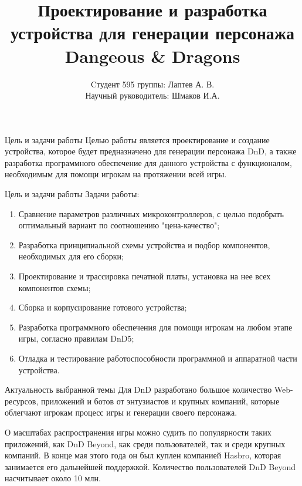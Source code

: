 \documentclass[12pt,a4paper,mathserif]{beamer}
\author[Лаптев А.В.]{{Cтудент 595 группы: Лаптев А. В.}\\
{Научный руководитель: Шмаков И.А.}}
\title[Научно-исследовательская работа]{Проектирование и разработка устройства для генерации персонажа Dangeous \& Dragons}
\begin{document}
\begin{frame}
\maketitle
\end{frame}

\begin{frame}{Цель и задачи работы}
    \setlength{\parindent}{0.5cm}
    Целью работы является проектирование и создание устройства, которое будет предназначено для генерации персонажа DnD, а также разработка программного обеспечение для данного устройства с функционалом, необходимым для помощи игрокам на протяжении всей игры.
\end{frame}

\begin{frame}{Цель и задачи работы}
    \setlength{\parindent}{0.5cm}
    Задачи работы:
    
    \begin{enumerate}
        \item Сравнение параметров различных микроконтроллеров, с целью подобрать оптимальный вариант по соотношению "цена-качество";
    
        \item Разработка принципиальной схемы устройства и подбор компонентов, необходимых для его сборки;
    
        \item Проектирование и трассировка печатной платы, установка на нее всех компонентов схемы;
    
        \item Сборка и корпусирование готового устройства;
    
        \item Разработка программного обеспечения для помощи игрокам на любом этапе игры, согласно правилам DnD5;
    
        \item Отладка и тестирование работоспособности программной и аппаратной части устройства.
    \end{enumerate}
\end{frame}

\begin{frame}{Актуальность выбранной темы}
    \setlength{\parindent}{0.5cm}
    Для DnD разработано большое количество Web-ресурсов, приложений и ботов от энтузиастов и крупных компаний, которые облегчают игрокам процесс игры и генерации своего персонажа.
    
    О масштабах распространения игры можно судить по популярности таких приложений, как DnD Beyond, как среди пользователей, так и среди крупных компаний. В конце мая этого года он был куплен компанией Hasbro, которая занимается его дальнейшей поддержкой. Количество пользователей DnD Beyond насчитывает около 10 млн.
\end{frame}
\end{document}

